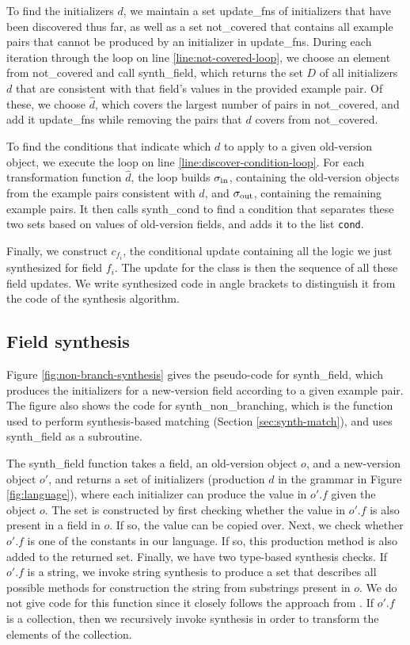 \documentclass[natbib]{sigplanconf}
\newcommand{\code}[1]{\lstinline|#1|\xspace}
\begin{document}
To find the initializers $d$, we maintain a set \textsf{update\_fns} of
initializers that have been discovered thus far, as well as
a set \textsf{not\_covered} that contains all example pairs that cannot
be produced by an initializer in \textsf{update\_fns}.  During each iteration
through the loop on line \ref{line:not-covered-loop}, we choose an
element from \textsf{not\_covered} and call \textsf{synth\_field},
which returns the set $D$ of all initializers $d$ that are
consistent with that field's values in the provided example pair.
Of these, we choose $\hat{d}$, which covers the largest number of
pairs in \textsf{not\_covered}, and add it \textsf{update\_fns}
while removing the pairs that $d$ covers from \textsf{not\_covered}.

To find the conditions that indicate which $d$ to apply to a given old-version
object, we execute the loop on line \ref{line:discover-condition-loop}.
For each transformation function $\hat{d}$, the loop builds ${\sigma_{\text{in}}}$,
containing the old-version objects from the example pairs 
consistent with $\hat{d}$, and ${\sigma_{\text{out}}}$, containing the remaining example pairs.
It then calls \textsf{synth\_cond} to find a condition that separates these two
sets based on values of old-version fields, and adds it to the list \code{cond}.

Finally, we construct $c_{f_i}$, the conditional update containing all the
logic we just synthesized for field $f_i$.  The update for the class is then
the sequence of all these field updates.  We write synthesized code in
angle brackets to distinguish it from the code of the synthesis
algorithm.

\subsection{Field synthesis}

Figure \ref{fig:non-branch-synthesis} gives the pseudo-code for
\textsf{synth\_field}, which produces the initializers for a
new-version field according to a given example pair.
The figure also shows the code for \textsf{synth\_non\_branching},
which is the function used to perform synthesis-based matching
(Section \ref{sec:synth-match}), and uses \textsf{synth\_field} as a
subroutine.

The \textsf{synth\_field} function takes a field, an old-version
object $o$, and a new-version object $o'$, and returns a set of initializers
(production $d$ in the grammar in Figure \ref{fig:language}), where
each initializer can produce the value in $o'.f$ given the object $o$.
The set is constructed by first checking whether the value in $o'.f$
is also present in a field in $o$.  If so, the value can be copied over.
Next, we check whether $o'.f$ is one of the constants in our language.
If so, this production method is also added to the returned set.
Finally, we have two type-based synthesis checks.  If $o'.f$ is a string,
we invoke string synthesis to produce a set that describes all possible
methods for construction the string from substrings present in $o$.
We do not give code for this function since it closely follows the approach
from \cite{Gulwani:popl:2011}.  If $o'.f$ is a collection, then we
recursively invoke synthesis in order to transform the elements of the
collection.
\end{document}
